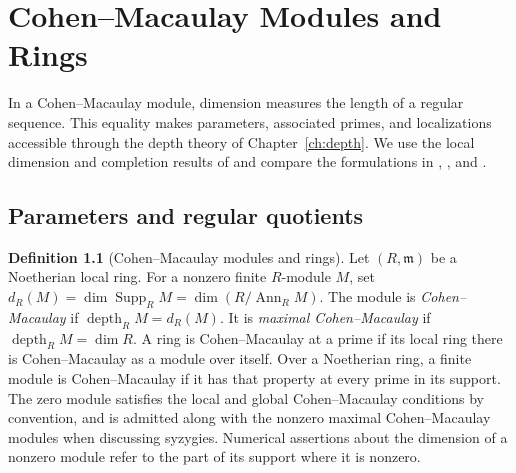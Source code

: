 \documentclass[11pt,oneside,openany]{book}
\theoremstyle{definition}
\newtheorem{definition}[theorem]{Definition}
\theoremstyle{remark}
\begin{document}
\chapter{Cohen--Macaulay Modules and Rings}
\label{ch:cohen-macaulay}

In a Cohen--Macaulay module, dimension measures the length of a
regular sequence. This equality makes parameters, associated primes,
and localizations accessible through the depth theory of Chapter~\ref{ch:depth}.
We use the local dimension and completion results of \cite{p103} and
compare the formulations in \cite[Chapter 18]{eisenbud},
\cite[Sections 2.1--2.3]{brunsherzog}, and \cite[Section 17]{matsumura}.

\section{Parameters and regular quotients}

\begin{definition}[Cohen--Macaulay modules and rings]\label{res:CM-01}
Let $(R,\mathfrak m)$ be a Noetherian local ring. For a nonzero
finite $R$-module $M$, set
$d_R(M)=\dim\operatorname{Supp}_R M=\dim(R/\operatorname{Ann}_R M)$.
The module is \emph{Cohen--Macaulay} if
$\operatorname{depth}_R M=d_R(M)$. It is \emph{maximal
Cohen--Macaulay} if $\operatorname{depth}_R M=\dim R$. A ring is
Cohen--Macaulay at a prime if its local ring there is Cohen--Macaulay
as a module over itself. Over a Noetherian ring, a finite module
is Cohen--Macaulay if it has that property at every prime in its
support. The zero module satisfies the local and global
Cohen--Macaulay conditions by convention, and is admitted along
with the nonzero maximal Cohen--Macaulay modules when discussing
syzygies. Numerical assertions about the dimension of a nonzero
module refer to the part of its support where it is nonzero.
\end{definition}
\end{document}
